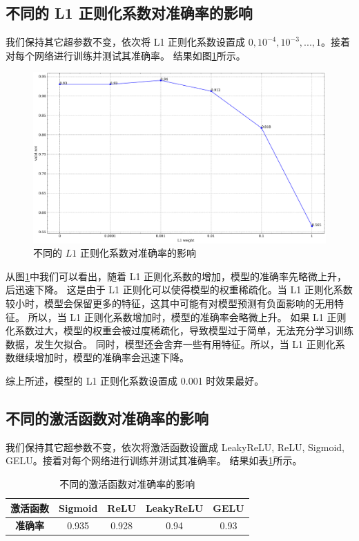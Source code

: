 \documentclass[supercite]{Experimental_Report}
\theoremstyle{definition}
\begin{document}
\subsection{不同的 L1 正则化系数对准确率的影响}
我们保持其它超参数不变，依次将 L1 正则化系数设置成 $0, 10^{-4}, 10^{-3}, ..., 1$。接着对每个网络进行训练并测试其准确率。
结果如图\ref{不同的l1_weight}所示。
\begin{figure}[H]
	\begin{center}
		\includegraphics[scale=0.35]{../images/不同的l1_weight.pdf}
		\caption{不同的 $L1$ 正则化系数对准确率的影响}
		\label{不同的l1_weight}
	\end{center}
\end{figure}

从图\ref{不同的l1_weight}中我们可以看出，随着 L1 正则化系数的增加，模型的准确率先略微上升，后迅速下降。
这是由于 L1 正则化可以使得模型的权重稀疏化。当 L1 正则化系数较小时，模型会保留更多的特征，这其中可能有对模型预测有负面影响的无用特征。
所以，当 L1 正则化系数增加时，模型的准确率会略微上升。
如果 L1 正则化系数过大，模型的权重会被过度稀疏化，导致模型过于简单，无法充分学习训练数据，发生欠拟合。
同时，模型还会舍弃一些有用特征。所以，当 L1 正则化系数继续增加时，模型的准确率会迅速下降。

综上所述，模型的 L1 正则化系数设置成 0.001 时效果最好。

\subsection{不同的激活函数对准确率的影响}
我们保持其它超参数不变，依次将激活函数设置成 LeakyReLU, ReLU, Sigmoid, GELU。接着对每个网络进行训练并测试其准确率。
结果如表\ref{不同的激活函数}所示。
\begin{table}[H]
	\centering
	\caption{不同的激活函数对准确率的影响}
	  \begin{tabular}{c|cccc}
		\toprule
	  \textbf{激活函数} & Sigmoid & ReLU  & LeakyReLU & GELU \\\hline
	  \textbf{准确率} & 0.935 & 0.928 & 0.94  & 0.93 \\
	  \bottomrule
	  \end{tabular}
	\label{不同的激活函数}
  \end{table}
\end{document}
